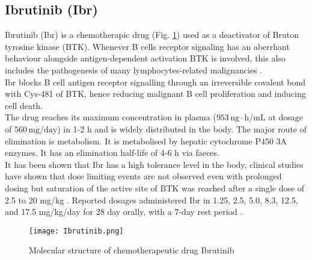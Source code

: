 \subsection{Ibrutinib (Ibr)}
Ibrutinib (Ibr) is a chemotherapic drug (Fig. \ref{fig:Ibr}) used as a deactivator of Bruton tyrosine kinase (BTK). Whenever B cells receptor signaling has an aberrhant behaviour alongside antigen-dependent activation BTK is involved, this also includes the pathogenesis of many lymphocytes-related malignancies \cite{ibr-1}.\\
Ibr blocks B cell antigen receptor signalling through an irreversible covalent bond with Cys-481 of BTK, hence reducing malignant B cell proliferation and inducing cell death.\\
The drug reaches its maximum concentration in plasma ($953\,\text{ng}\cdot\text{h}/\text{mL}$ at dosage of $560\,\text{mg}/\text{day}$) in 1-2 h and is widely distributed in the body. The major route of elimination is metabolism. It is metabolised by hepatic cytochrome P450 3A enzymes. It has an elimination half-life of 4-6 h via faeces.\\
It has been shown that Ibr has a high tolerance level in the body, clinical studies have shown that dose limiting events are not observed even with prolonged dosing \cite{ibr-2} but saturation of the active site of BTK was reached after a single dose of 2.5 to 20 mg/kg \cite{ibr-pubchem}. Reported dosages administered Ibr in 1.25, 2.5, 5.0, 8.3, 12.5, and 17.5 mg/kg/day for 28 day orally, with a 7-day rest period \cite{ibr-2}.
\begin{figure}[htbp!]
	\centering
	\texttt{[image: Ibrutinib.png]}
	\caption{Molecular structure of chemotherapeutic drug Ibrutinib}
	\label{fig:Ibr}
\end{figure}


